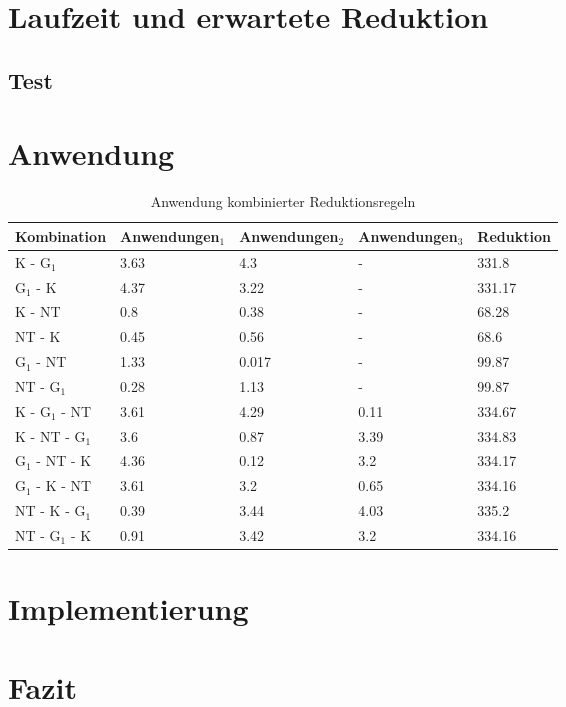 \documentclass{beamer}
\begin{document}
	\section{Laufzeit und erwartete Reduktion}
	\begin{frame}{}
	\end{frame}
	\subsection{Test}
	\section{Anwendung}
	\begin{frame}{}
	\begin{table}[htbp]
\caption{Anwendung kombinierter Reduktionsregeln\label{tab:kombination}}
\vspace*{1em}
\centering

\bgroup
\def\arraystretch{1.3}%
\tiny
\begin{tabular}[c]{l|l|l|l|l}

	
	\multicolumn{1}{c|}{\textbf{Kombination}} &
	\multicolumn{1}{c|}{\textbf{Anwendungen$_{1}$}} &
	\multicolumn{1}{c|}{\textbf{Anwendungen$_{2}$}} &
	\multicolumn{1}{c|}{\textbf{Anwendungen$_{3}$}} & 
	\multicolumn{1}{c}{\textbf{Reduktion}} \\
	\hline

	K - G$_{1}$ & 3.63 & 4.3 & - &331.8\\
	G$_{1}$ - K & 4.37 & 3.22 & - &331.17\\
	K - NT & 0.8 & 0.38 & - & 68.28 \\
	NT - K & 0.45 & 0.56 & - & 68.6\\
	G$_{1}$ - NT & 1.33 & 0.017 & - & 99.87\\
	NT - G$_{1}$ & 0.28 & 1.13 & - & 99.87\\
	K  - G$_{1}$ - NT & 3.61 & 4.29 & 0.11 & 334.67 \\
	K - NT - G$_{1}$ & 3.6 & 0.87 & 3.39 & 334.83 \\
	G$_{1}$ - NT - K & 4.36 & 0.12 & 3.2 & 334.17 \\
	G$_{1}$ - K - NT & 3.61 & 3.2 & 0.65 & 334.16 \\
	NT - K - G$_{1}$ & 0.39 & 3.44 & 4.03 & 335.2 \\
	NT - G$_{1}$ - K & 0.91 & 3.42 & 3.2 & 334.16 \\

	
\end{tabular}

\egroup

\end{table}
	\end{frame}
	
	\section{Implementierung}
	\begin{frame}{}
	\end{frame}
	
	\section{Fazit}
	\begin{frame}{}
	\end{frame}
  
\end{document}
